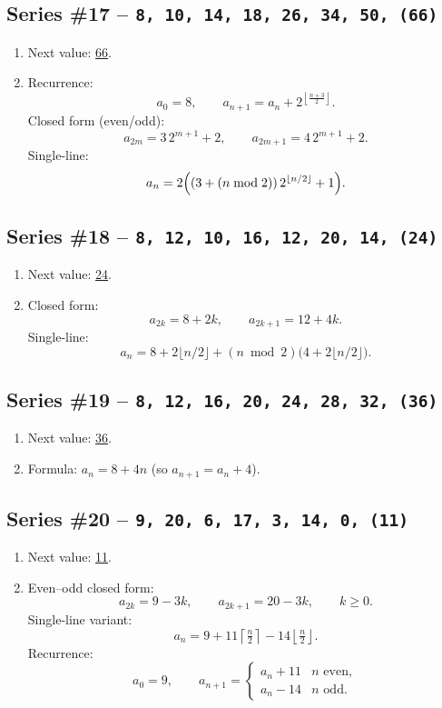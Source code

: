 \documentclass{sn-jnl}
\theoremstyle{definition}
\newcommand{\seq}[1]{\texttt{#1}}
\newcommand{\nextval}[1]{\underline{#1}}
\begin{document}
{%
\subsection*{Series \#17 -- \seq{8,\,10,\,14,\,18,\,26,\,34,\,50,\,(66)}}
\begin{enumerate}[label=(\alph*)]
  \item Next value: \nextval{66}.
  \item Recurrence:
  \[
    a_0=8,\qquad a_{n+1}=a_n+2^{\left\lfloor\frac{n+3}{2}\right\rfloor}.
  \]
  Closed form (even/odd):
  \[
    a_{2m}=3\,2^{m+1}+2,\qquad a_{2m+1}=4\,2^{m+1}+2.
  \]
  Single‑line:
  \[a_n = 2\Bigl((3+(n\bmod 2))\,2^{\lfloor n/2\rfloor}+1\Bigr).\]
\end{enumerate}

\subsection*{Series \#18 -- \seq{8,\,12,\,10,\,16,\,12,\,20,\,14,\,(24)}}
\begin{enumerate}[label=(\alph*)]
  \item Next value: \nextval{24}.
  \item Closed form:
  \[
    a_{2k}=8+2k,\qquad a_{2k+1}=12+4k.
  \]
  Single‑line:
  \[a_n = 8+2\lfloor n/2\rfloor+(n\bmod 2)\bigl(4+2\lfloor n/2\rfloor\bigr).\]
\end{enumerate}

\subsection*{Series \#19 -- \seq{8,\,12,\,16,\,20,\,24,\,28,\,32,\,(36)}}
\begin{enumerate}[label=(\alph*)]
  \item Next value: \nextval{36}.
  \item Formula: $a_n=8+4n$ \;(so $a_{n+1}=a_n+4$).
\end{enumerate}

\subsection*{Series \#20 -- \seq{9,\,20,\,6,\,17,\,3,\,14,\,0,\,(11)}}
\begin{enumerate}[label=(\alph*)]
  \item Next value: \nextval{11}.
  \item Even--odd closed form:
  \[
    a_{2k}=9-3k,\qquad a_{2k+1}=20-3k,\qquad k\ge0.
  \]
  Single‑line variant:
  \[a_n = 9+11\left\lceil\tfrac{n}{2}\right\rceil-14\left\lfloor\tfrac{n}{2}\right\rfloor.\]
  Recurrence:
  \[
    a_0=9,\qquad a_{n+1}=\begin{cases}a_n+11 & n\text{ even},\\[4pt]a_n-14 & n\text{ odd}.\end{cases}
  \]
\end{enumerate}}
\end{document}
